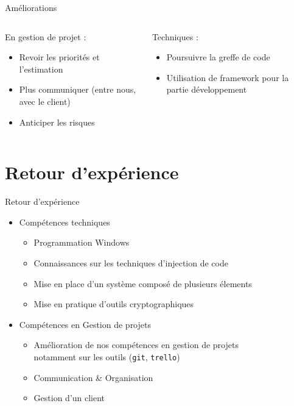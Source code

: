 \documentclass{cubeamer}
\begin{document}
\begin{frame}{Améliorations}
    \begin{columns}
        \begin{column}{0.5\textwidth}
            En gestion de projet :
            \begin{itemize}
                \item Revoir les priorités et l'estimation
                \item Plus communiquer (entre nous, avec le client)
                \item Anticiper les risques
            \end{itemize}
        \end{column}
        
        \begin{column}{0.5\textwidth}
            Techniques :
            \begin{itemize}
                \item Poursuivre la greffe de code
                \item Utilisation de framework pour la partie développement
            \end{itemize}
        \end{column}
    \end{columns}
\end{frame}

\section{Retour d'expérience}

\begin{frame}{Retour d'expérience}
    \begin{itemize}
        \item Compétences techniques 
            \begin{itemize}
                \item Programmation Windows 
                \item Connaissances sur les techniques d'injection de code
                \item Mise en place d'un système composé de plusieurs élements
                \item Mise en pratique d'outils cryptographiques
            \end{itemize}
        \item Compétences en Gestion de projets
             \begin{itemize}
                \item Amélioration de nos compétences en gestion de projets \\
                  notamment sur les outils (\verb:git:, \verb:trello:)
                \item Communication \& Organisation
                \item Gestion d'un client
            \end{itemize}           
    \end{itemize}
\end{frame}
\end{document}
